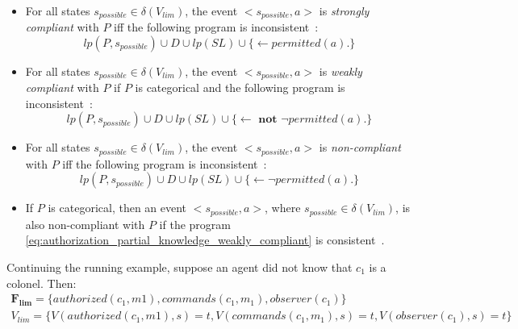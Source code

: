 \begin{definition}
    \label{def:authorization_event_compliance_partial_knowledge}
    ~

    \begin{itemize}
        \item For all states $s_{possible} \in \delta(V_{lim})$, the event $<s_{possible}, a>$ is \textit{strongly compliant} with $P$ iff the following program is inconsistent~\citep{gelfond_authorization_2008}:
            \begin{equation}
                \label{eq:authorization_partial_knowledge_strongly_compliant}
                lp(P, s_{possible}) \cup D \cup lp(SL) \cup \{ \leftarrow permitted(a). \}
            \end{equation}
        \item For all states $s_{possible} \in \delta(V_{lim})$, the event $<s_{possible}, a>$ is \textit{weakly compliant} with $P$ if $P$ is categorical and the following program is inconsistent~\citep{gelfond_authorization_2008}:
            \begin{equation}
                \label{eq:authorization_partial_knowledge_weakly_compliant}
                lp(P, s_{possible}) \cup D \cup lp(SL) \cup \{ \leftarrow \textbf{ not } \neg permitted(a). \}
            \end{equation}
        \item For all states $s_{possible} \in \delta(V_{lim})$, the event $<s_{possible}, a>$ is \textit{non-compliant} with $P$ iff the following program is inconsistent~\citep{gelfond_authorization_2008}:
            \begin{equation}
                \label{eq:authorization_partial_knowledge_non_compliant}
                lp(P, s_{possible}) \cup D \cup lp(SL) \cup \{ \leftarrow \neg permitted(a). \}
            \end{equation}
        \item If $P$ is categorical, then an event $<s_{possible}, a>$, where $s_{possible} \in \delta(V_{lim})$, is also non-compliant with $P$ if the program \cref{eq:authorization_partial_knowledge_weakly_compliant} is consistent~\citep{gelfond_authorization_2008}.
    \end{itemize}
\end{definition}

Continuing the running example, suppose an agent did not know that $c_1$ is a colonel. Then:
\begin{gather}
    \boldsymbol{F_{lim}} = \{ authorized(c_1, m1), commands(c_1, m_1), observer(c_1) \} \\
    V_{lim} = \{ V(authorized(c_1, m1), s) = t, V(commands(c_1, m_1), s) = t, V(observer(c_1), s) = t \}
\end{gather}


